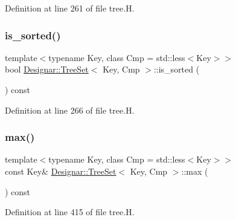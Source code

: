 Definition at line 261 of file tree.\+H.

\mbox{\label{class_designar_1_1_tree_set_a6321737660e743877ece201a0af184d0}} 
\subsubsection{\texorpdfstring{is\+\_\+sorted()}{is\_sorted()}}
{\footnotesize\ttfamily template$<$typename Key, class Cmp = std\+::less$<$\+Key$>$$>$ \\
bool \hyperlink{class_designar_1_1_tree_set}{Designar\+::\+Tree\+Set}$<$ Key, Cmp $>$\+::is\+\_\+sorted (\begin{DoxyParamCaption}{ }\end{DoxyParamCaption}) const\hspace{0.3cm}{\ttfamily [inline]}}



Definition at line 266 of file tree.\+H.

\mbox{\label{class_designar_1_1_tree_set_a7456e486d8d35aa2c21387389cab091d}} 
\subsubsection{\texorpdfstring{max()}{max()}}
{\footnotesize\ttfamily template$<$typename Key, class Cmp = std\+::less$<$\+Key$>$$>$ \\
const Key\& \hyperlink{class_designar_1_1_tree_set}{Designar\+::\+Tree\+Set}$<$ Key, Cmp $>$\+::max (\begin{DoxyParamCaption}{ }\end{DoxyParamCaption}) const\hspace{0.3cm}{\ttfamily [inline]}}



Definition at line 415 of file tree.\+H.

\mbox{\label{class_designar_1_1_tree_set_a12b0c311162ba44de775258ef9897800}} 
